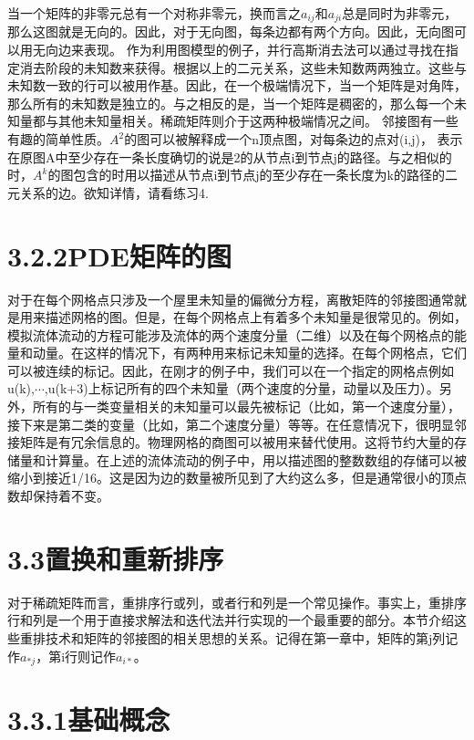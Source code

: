 \documentclass{article}
\begin{document}
\newline
当一个矩阵的非零元总有一个对称非零元，换而言之$a_{ij}$和$a_{ji}$总是同时为非零元，那么这图就是无向的。因此，对于无向图，每条边都有两个方向。因此，无向图可以用无向边来表现。
\newline
作为利用图模型的例子，并行高斯消去法可以通过寻找在指定消去阶段的未知数来获得。根据以上的二元关系，这些未知数两两独立。这些与未知数一致的行可以被用作基。因此，在一个极端情况下，当一个矩阵是对角阵，那么所有的未知数是独立的。与之相反的是，当一个矩阵是稠密的，那么每一个未知量都与其他未知量相关。稀疏矩阵则介于这两种极端情况之间。
\newline
邻接图有一些有趣的简单性质。$A^2$的图可以被解释成一个n顶点图，对每条边的点对(i,j)， 表示在原图A中至少存在一条长度确切的说是2的从节点i到节点j的路径。与之相似的时，$A^k$的图包含的时用以描述从节点i到节点j的至少存在一条长度为k的路径的二元关系的边。欲知详情，请看练习4.
\newline
\section*{3.2.2PDE矩阵的图}

对于在每个网格点只涉及一个屋里未知量的偏微分方程，离散矩阵的邻接图通常就是用来描述网格的图。但是，在每个网格点上有着多个未知量是很常见的。例如，模拟流体流动的方程可能涉及流体的两个速度分量（二维）以及在每个网格点的能量和动量。在这样的情况下，有两种用来标记未知量的选择。在每个网格点，它们可以被连续的标记。因此，在刚才的例子中，我们可以在一个指定的网格点例如u(k),$\cdots$,u(k+3)上标记所有的四个未知量（两个速度的分量，动量以及压力）。另外，所有的与一类变量相关的未知量可以最先被标记（比如，第一个速度分量），接下来是第二类的变量（比如，第二个速度分量）等等。在任意情况下，很明显邻接矩阵是有冗余信息的。物理网格的商图可以被用来替代使用。这将节约大量的存储量和计算量。在上述的流体流动的例子中，用以描述图的整数数组的存储可以被缩小到接近1/16。这是因为边的数量被所见到了大约这么多，但是通常很小的顶点数却保持着不变。
\newline
\section*{3.3置换和重新排序}

对于稀疏矩阵而言，重排序行或列，或者行和列是一个常见操作。事实上，重排序行和列是一个用于直接求解法和迭代法并行实现的一个最重要的部分。本节介绍这些重排技术和矩阵的邻接图的相关思想的关系。记得在第一章中，矩阵的第j列记作$a_{*j}$，第i行则记作$a_{i*}$。
\newline
\section*{3.3.1基础概念}
\end{document}
